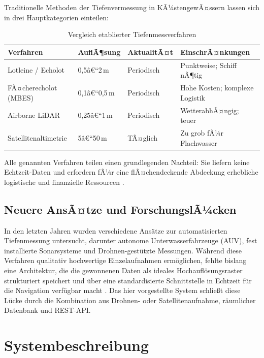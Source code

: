﻿\documentclass[a4paper,12pt]{article}
\theoremstyle{definition}
\begin{document}
Traditionelle Methoden der Tiefenvermessung in KÃ¼stengewÃ¤ssern lassen sich in drei
Hauptkategorien einteilen:

\begin{table}[H]
\centering
\caption{Vergleich etablierter Tiefenmessverfahren}
\label{tab:verfahren}
\renewcommand{\arraystretch}{1.3}
\begin{tabular}{@{}p{3.5cm}p{3cm}p{3.5cm}p{3.5cm}@{}}
\toprule
\textbf{Verfahren} & \textbf{AuflÃ¶sung} & \textbf{AktualitÃ¤t} & \textbf{EinschrÃ¤nkungen} \\
\midrule
Lotleine / Echolot & 0{,}5â€“2\,m & Periodisch & Punktweise; Schiff nÃ¶tig \\
FÃ¤cherecholot (MBES) & 0{,}1â€“0{,}5\,m & Periodisch & Hohe Kosten; komplexe Logistik \\
Airborne LiDAR & 0{,}25â€“1\,m & Periodisch & WetterabhÃ¤ngig; teuer \\
Satellitenaltimetrie & 5â€“50\,m & TÃ¤glich & Zu grob fÃ¼r Flachwasser \\
\bottomrule
\end{tabular}
\end{table}

\noindent
Alle genannten Verfahren teilen einen grundlegenden Nachteil: Sie liefern keine
Echtzeit-Daten und erfordern fÃ¼r eine flÃ¤chendeckende Abdeckung erhebliche logistische
und finanzielle Ressourcen \cite{guenther2000, parente2020}.

\subsection{Neuere AnsÃ¤tze und ForschungslÃ¼cken}

In den letzten Jahren wurden verschiedene Ans\"{a}tze zur automatisierten Tiefenmessung
untersucht, darunter autonome Unterwasserfahrzeuge (AUV), fest installierte Sonarsysteme
und Drohnen-gest\"{u}tzte Messungen. W\"{a}hrend diese Verfahren qualitativ hochwertige
Einzelaufnahmen erm\"{o}glichen, fehlte bislang eine Architektur, die die gewonnenen Daten
als ideales Hochaufl\"{o}sungsraster strukturiert speichert und \"{u}ber eine standardisierte
Schnittstelle in Echtzeit f\"{u}r die Navigation verf\"{u}gbar macht \cite{argo2021, stationary2022}.
Das hier vorgestellte System schlie\ss{}t diese L\"{u}cke durch die Kombination aus
Drohnen- oder Satelliten\-aufnahme, r\"{a}umlicher Datenbank und REST-API.

\section{Systembeschreibung}
\end{document}
